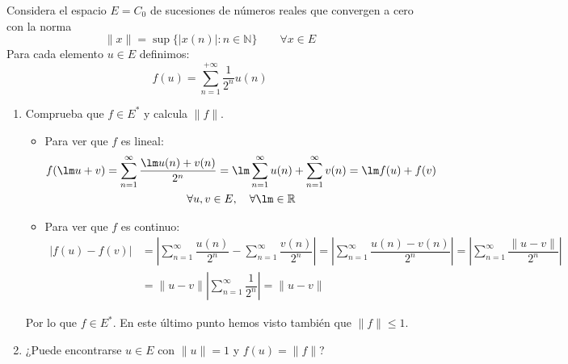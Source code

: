 \begin{ejercicio}
    Considera el espacio $E=C_0$ de sucesiones de números reales que convergen a cero con la norma 
    \begin{equation*}
        \|x\| = \sup\{|x(n)| : n\in \mathbb{N}\} \qquad \forall x\in E
    \end{equation*}
    Para cada elemento $u\in E$ definimos:
    \begin{equation*}
        f(u) = \sum_{n=1}^{+\infty}\dfrac{1}{2^n}u(n)
    \end{equation*}
    \begin{enumerate}[label=\alph*)]
        \item Comprueba que $f\in E^\ast$ y calcula $\|f\|$.

            \begin{itemize}
                \item Para ver que $f$ es lineal:
                    \begin{multline*}
                        f(\lm u + v) = \sum_{n=1}^{\infty} \dfrac{\lm u(n)+v(n)}{2^n} = \lm \sum_{n=1}^{\infty}u(n) + \sum_{n=1}^{\infty}v(n) = \lm f(u)+f(v) \\ \forall u,v\in E, \quad \forall \lm\in \mathbb{R}
                    \end{multline*}
                \item Para ver que $f$ es continuo:
                    \begin{align*}
                        |f(u)-f(v)| &= \left|\sum_{n=1}^{\infty}\dfrac{u(n)}{2^n} - \sum_{n=1}^{\infty}\dfrac{v(n)}{2^n}\right| = \left|\sum_{n=1}^{\infty}\dfrac{u(n)-v(n)}{2^n}\right| = \left|\sum_{n=1}^{\infty}\dfrac{\|u-v\|}{2^n}\right| \\ &= \|u-v\| \left|\sum_{n=1}^{\infty}\dfrac{1}{2^n}\right| = \|u-v\|
                    \end{align*}
            \end{itemize}
            Por lo que $f\in E^\ast$. En este último punto hemos visto también que $\|f\|\leq 1$. %
        \item ¿Puede encontrarse $u\in E$ con $\|u\| = 1$ y $f(u) = \|f\|$?
    \end{enumerate}
\end{ejercicio}

